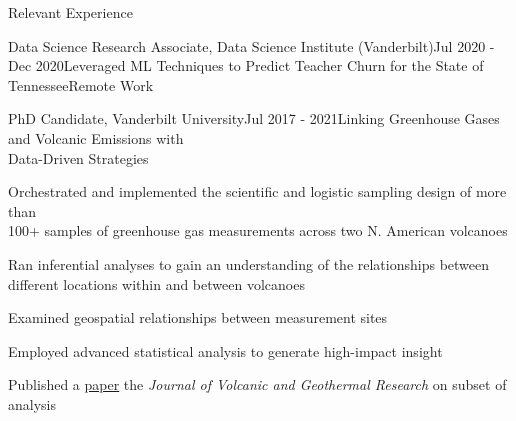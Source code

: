 \documentclass{resume} %
\newcommand{\commentblock}[1]{}
\begin{document}
\begin{rSection}{Relevant Experience}
\begin{rSubsection}{Data Science Research Associate, Data Science Institute (Vanderbilt)}{Jul 2020 - Dec 2020}{Leveraged ML Techniques to Predict Teacher Churn for the State of Tennessee}{Remote Work}
\end{rSubsection} 

\commentblock{
    \begin{rSubsection}{PhD Candidate, Vanderbilt University}{May 2019 - 2021}{Collaborating with National Oceanographic and Atmospheric Administration (NOAA)}{Oak Ridge, TN}
    \item {Processed GBs of data from gas measurements taking place over the course of a year}
    \item {With Python (e.g. pandas, scikit-learn), the data was wrangled, cleaned, \\ and analyzed to illustrate key insights from the study}
    \item {Employing advanced statistical analyses on large time series data sets}
    \item {Used random forest and other ML techniques modeling to fill gaps of missing data \\ within the time series data sets}
    
    \end{rSubsection}
}


\begin{rSubsection}{PhD Candidate, Vanderbilt University}{Jul 2017 - 2021}{Linking Greenhouse Gases and Volcanic Emissions with \\ Data-Driven Strategies}{}
\item {Orchestrated and implemented the scientific and logistic sampling design of more than \\ 100+ samples of greenhouse gas measurements across two N. American volcanoes}
\item {Ran inferential analyses to gain an understanding of the relationships between \\ different locations within and between volcanoes}
\item {Examined geospatial relationships between measurement sites}
\item {Employed advanced statistical analysis to generate high-impact insight}
\item {Published a \href{https://www.sciencedirect.com/science/article/abs/pii/S0377027321000627#preview-section-abstract}{paper} the \emph{Journal of Volcanic and Geothermal Research} on subset of analysis}

\end{rSubsection}


\end{rSection}
\end{document}
